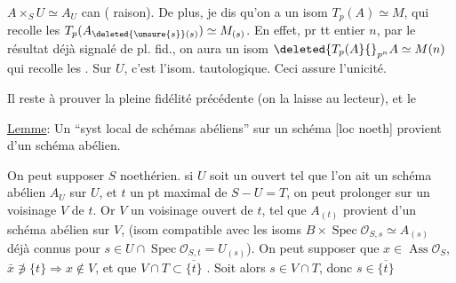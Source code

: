 $A\times_S U\simeq A_U$ can ( raison). De plus, je dis qu'on a un isom $T_p(A)\simeq M$, qui recolle les $T_p(A_{\deleted{\unsure{s}}(s)})\simeq M_{(s)}$. En effet, pr tt entier $n$, par le résultat déjà signalé de pl. fid., on aura un isom $\deleted{T_p(A}{}_{p^n}A\simeq M(n)$ qui recolle les
. Sur $U$, c'est l'isom. tautologique. Ceci assure l'unicité.

Il reste à prouver la pleine fidélité précédente (on la laisse au lecteur), et le

\uline{Lemme}: Un ``syst local de schémas abéliens'' sur un schéma [loc noeth]  provient d'un schéma abélien.

On peut supposer $S$ noethérien.   si $U$  soit un ouvert tel que l'on ait un schéma abélien $A_U$ sur $U$, et $t$ un pt maximal de $S-U=T$, on peut prolonger sur un voisinage $V$ de $t$. Or  $V$ un voisinage ouvert de $t$, tel que $A_{(t)}$ provient d'un schéma abélien sur $V$,    (isom compatible avec les isoms $B\times\operatorname{Spec}\mathcal O_{S,s}\simeq A_{(s)}$ déjà connus pour $s\in U\cap\operatorname{Spec}\mathcal O_{S,t}=U_{(s)}$).  On peut supposer que $x\in\operatorname{Ass}\mathcal O_S$, $\bar x\not\ni\{t\}\Rightarrow x\notin V$, et que $V\cap T\subset\overline{\{t\}}$ . Soit alors $s\in V\cap T$, donc $s\in\overline{\{t\}}$

